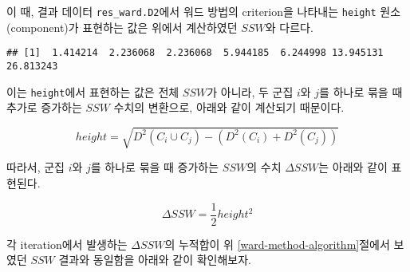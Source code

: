 \documentclass[
]{book}
\newenvironment{Shaded}{\begin{snugshade}}{\end{snugshade}}
\newcommand{\NormalTok}[1]{#1}
\newcommand{\SpecialCharTok}[1]{\textcolor[rgb]{0.00,0.00,0.00}{#1}}
\begin{document}
이 때, 결과 데이터 \texttt{res\_ward.D2}에서 워드 방법의 criterion을 나타내는 \texttt{height} 원소(component)가 표현하는 값은 위에서 계산하였던 \(SSW\)와 다르다.

\begin{Shaded}
\end{Shaded}

\begin{verbatim}
## [1]  1.414214  2.236068  2.236068  5.944185  6.244998 13.945131 26.813243
\end{verbatim}

이는 \texttt{height}에서 표현하는 값은 전체 \(SSW\)가 아니라, 두 군집 \(i\)와 \(j\)를 하나로 묶을 때 추가로 증가하는 \(SSW\) 수치의 변환으로, 아래와 같이 계산되기 때문이다.

\begin{equation}
height = \sqrt{D^2(C_i \cup C_j) - \left(D^2(C_i) + D^2(C_j)\right)}
\label{eq:hclust-height}
\end{equation}

따라서, 군집 \(i\)와 \(j\)를 하나로 묶을 때 증가하는 \(SSW\)의 수치 \(\Delta SSW\)는 아래와 같이 표현된다.

\begin{equation}
\Delta SSW = \frac{1}{2} height^2
\end{equation}

각 iteration에서 발생하는 \(\Delta SSW\)의 누적합이 위 \ref{ward-method-algorithm}절에서 보였던 \(SSW\) 결과와 동일함을 아래와 같이 확인해보자.
\end{document}
